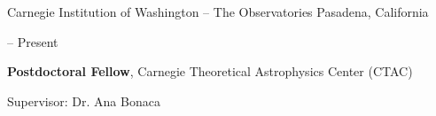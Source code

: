 \documentclass[cv.tex]{subfiles}
\begin{document}
{\color{themecolor} \large
Carnegie Institution of Washington -- The Observatories
}
\hfill
Pasadena, California
\par\noindent
\parbox{0.18\textwidth}{%
	\vspace{-1mm}
	 -- Present \par
	\null
}
\hspace{1mm}
\parbox{0.8\textwidth}{%
	\textbf{Postdoctoral Fellow}, Carnegie Theoretical Astrophysics Center 
	(CTAC) \par
	Supervisor: Dr. Ana Bonaca
}
\end{document}
